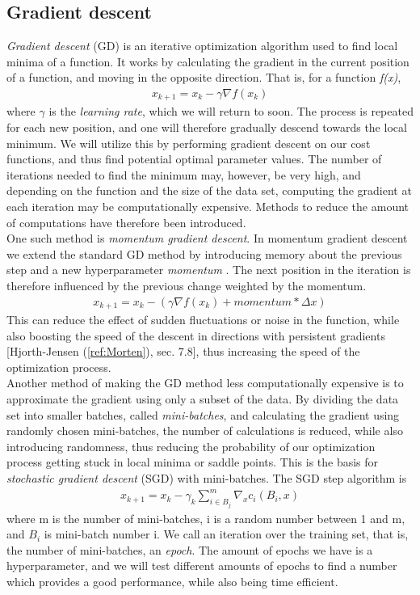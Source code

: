 \documentclass[english,notitlepage,reprint,nofootinbib]{revtex4-1}  %
\begin{document}
\subsection{Gradient descent}
\textit{Gradient descent} (GD) is an iterative optimization algorithm used to find local minima of a function. It works by calculating the gradient in the current position of a function, and moving in the opposite direction. That is, for a function \textit{f(x)}, 
\begin{align}
    x_{k+1} = x_{k} - \gamma \nabla f(x_{k})
\end{align}
where $\gamma$ is the \textit{learning rate}, which we will return to soon. The process is repeated for each new position, and one will therefore gradually descend towards the local minimum. We will utilize this by performing gradient descent on our cost functions, and thus find potential optimal parameter values. The number of iterations needed to find the minimum may, however, be very high, and depending on the function and the size of the data set, computing the gradient at each iteration may be computationally expensive. Methods to reduce the amount of computations have therefore been introduced.\\
One such method is \textit{momentum gradient descent}. In momentum gradient descent we extend the standard GD method by introducing memory about the previous step and a new hyperparameter \textit{momentum} . The next position in the iteration is therefore influenced by the previous change weighted by the momentum.
\begin{align}
    x_{k+1} = x_{k} - (\gamma \nabla f(x_{k}) + momentum * \Delta x)
\end{align}
This can reduce the effect of sudden fluctuations or noise in the function, while also boosting the speed of the descent in directions with persistent gradients [Hjorth-Jensen (\ref{ref:Morten}), sec. 7.8], thus increasing the speed of the optimization process.
\\
Another method of making the GD method less computationally expensive is to approximate the gradient using only a subset of the data. %
By dividing the data set into smaller batches, called \textit{mini-batches}, and calculating the gradient using randomly chosen mini-batches, the number of calculations is reduced, while also introducing randomness, thus reducing the probability of our optimization process getting stuck in local minima or saddle points. %
This is the basis for \textit{stochastic gradient descent} (SGD) with mini-batches. The SGD step algorithm is 
\begin{align}
    x_{k+1} = x_{k} - \gamma_{k} \sum_{i \in B_{j}}^{m} \nabla_{x} c_{i}(B_{i}, x)
\end{align}
where m is the number of mini-batches, i is a random number between 1 and m, and $B_{i}$ is mini-batch number i. We call an iteration over the training set, that is, the number of mini-batches, an \textit{epoch}. The amount of epochs we have is a hyperparameter, and we will test different amounts of epochs to find a number which provides a good performance, while also being time efficient. 
\end{document}

